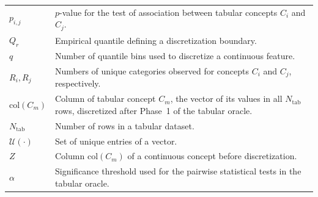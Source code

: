 \begin{longtable}{@{}>{\raggedright\arraybackslash}p{} p{}@{}}
	$p_{i,j}$                                          & $p$-value for the test of association between tabular concepts $C_i$ and $C_j$.                                                                                                                       \\
	$Q_r$                                              & Empirical quantile defining a discretization boundary.                                                                                                                                                \\
	$q$                                                & Number of quantile bins used to discretize a continuous feature.                                                                                                                                      \\
	$R_i,R_j$                                          & Numbers of unique categories observed for concepts $C_i$ and $C_j$, respectively.                                                                                                                     \\
	$\mathrm{col}(C_m)$                                & Column of tabular concept $C_m$, the vector of its values in all $N_{\mathrm{tab}}$ rows, discretized after Phase~1 of the tabular oracle.                                                            \\
	$N_{\mathrm{tab}}$                                 & Number of rows in a tabular dataset.                                                                                                                                                                  \\
	$\mathcal{U}(\cdot)$                               & Set of unique entries of a vector.                                                                                                                                                                    \\
	$Z$                                                & Column $\mathrm{col}(C_m)$ of a continuous concept before discretization.                                                                                                                             \\
	$\alpha$                                           & Significance threshold used for the pairwise statistical tests in the tabular oracle.                                                                                                                 \\

\end{longtable}
